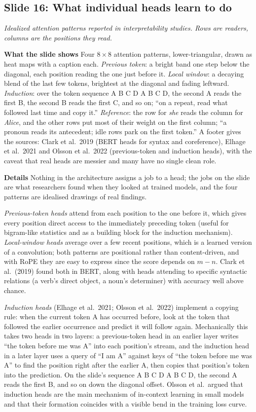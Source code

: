 \documentclass[11pt,letterpaper]{article}
\newcommand{\slide}[3]{%
  \subsection[Slide #1: #2]{Slide #1: #2}%
  {\color{muted}\itshape #3\par}\medskip}
\newcommand{\para}[1]{\medskip\noindent\textbf{#1}\quad}
\begin{document}
\slide{16}{What individual heads learn to do}{Idealized attention patterns reported in interpretability studies. Rows are readers, columns are the positions they read.}

\para{What the slide shows} Four $8\times8$ attention patterns, lower-triangular, drawn as heat maps with a caption each. \emph{Previous token}: a bright band one step below the diagonal, each position reading the one just before it. \emph{Local window}: a decaying blend of the last few tokens, brightest at the diagonal and fading leftward. \emph{Induction}: over the token sequence A B C D A B C D, the second A reads the first B, the second B reads the first C, and so on; ``on a repeat, read what followed last time and copy it.'' \emph{Reference}: the row for \emph{she} reads the column for \emph{Alice}, and the other rows put most of their weight on the first column; ``a pronoun reads its antecedent; idle rows park on the first token.'' A footer gives the sources: Clark et al.\ 2019 (BERT heads for syntax and coreference), Elhage et al.\ 2021 and Olsson et al.\ 2022 (previous-token and induction heads), with the caveat that real heads are messier and many have no single clean role.

\para{Details} Nothing in the architecture assigns a job to a head; the jobs on the slide are what researchers found when they looked at trained models, and the four patterns are idealised drawings of real findings.

\emph{Previous-token heads} attend from each position to the one before it, which gives every position direct access to the immediately preceding token (useful for bigram-like statistics and as a building block for the induction mechanism). \emph{Local-window heads} average over a few recent positions, which is a learned version of a convolution; both patterns are positional rather than content-driven, and with RoPE they are easy to express since the score depends on $m-n$. Clark et al.\ (2019) found both in BERT, along with heads attending to specific syntactic relations (a verb's direct object, a noun's determiner) with accuracy well above chance.

\emph{Induction heads} (Elhage et al.\ 2021; Olsson et al.\ 2022) implement a copying rule: when the current token A has occurred before, look at the token that followed the earlier occurrence and predict it will follow again. Mechanically this takes two heads in two layers: a previous-token head in an earlier layer writes ``the token before me was A'' into each position's stream, and the induction head in a later layer uses a query of ``I am A'' against keys of ``the token before me was A'' to find the position right after the earlier A, then copies that position's token into the prediction. On the slide's sequence A B C D A B C D, the second A reads the first B, and so on down the diagonal offset. Olsson et al.\ argued that induction heads are the main mechanism of in-context learning in small models and that their formation coincides with a visible bend in the training loss curve.
\end{document}
